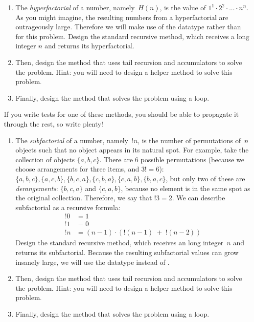 \begin{enumerate}[label=(\alph*)]
    \item The \emph{hyperfactorial} of a number, namely~$H(n)$, is the value of $1^1 \cdot 2^2 \cdot ... \cdot n^n$. As you might imagine, the resulting numbers from a hyperfactorial are outrageously large. Therefore we will make use of the  datatype rather than  for this problem. 
    Design the standard recursive  method, which receives a long integer $n$ and returns its hyperfactorial.
    \item Then, design the  method that uses tail recursion and accumulators to solve the problem. Hint: you will need to design a  helper method to solve this problem.
    \item Finally, design the  method that solves the problem using a loop.
\end{enumerate}
If you write tests for one of these methods, you should be able to propagate it through the rest, so write plenty!


\begin{enumerate}[label=(\alph*)]
    \item The \emph{subfactorial} of a number, namely~$!n$, is the number of permutations of~$n$ objects such that no object appears in its natural spot. For example, take the collection of objects $\{a, b, c\}$. There are $6$ possible permutations (because we choose arrangements for three items, and $3!=6$): $\{a, b, c\}, \{a, c, b\}, \{b, c, a\}, \{c, b, a\}, \{c, a, b\}, \{b, a, c\}$, but only two of these are \emph{derangements}: $\{b, c, a\}$ and $\{c, a, b\}$, because no element is in the same spot as the original collection. Therefore, we say that $!3=2$. We can describe subfactorial as a recursive formula:
\begin{align*}
    !0 &= 1\\
    !1 &= 0\\
    !n &= (n-1) \cdot (!(n - 1)\;+\;!(n - 2))
\end{align*}
    Design the standard recursive  method, which receives an long integer~$n$ and returns its subfactorial. Because the resulting subfactorial values can grow insanely large, we will use the  datatype instead of .
    \item Then, design the  method that uses tail recursion and accumulators to solve the problem. Hint: you will need to design a  helper method to solve this problem.
    \item Finally, design the  method that solves the problem using a loop.
\end{enumerate}

